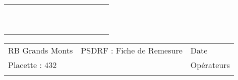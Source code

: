 \documentclass[a4paper, landscape]{article}\usepackage[]{graphicx}\usepackage[]{color}
\begin{document}
{\begin{tabular}{|p{1cm}|p{2cm}|p{1.6cm}|p{1.6cm}|p{1.6cm}|p{1.6cm}|p{1.5cm}|p{1.5cm}|p{1.5cm}|p{1.5cm}|p{1.5cm}|p{7.5cm}|p{5cm}|}
   \rowcolor[gray]{0.95} \hline
 &  &  &  &  &  &  &  &  &  &  &  &  \\ 
   \hline
 &  &  &  &  &  &  &  &  &  &  &  &  \\ 
   \rowcolor[gray]{0.95} \hline
 &  &  &  &  &  &  &  &  &  &  &  &  \\ 
   \hline
 &  &  &  &  &  &  &  &  &  &  &  &  \\ 
   \rowcolor[gray]{0.95} \hline
 &  &  &  &  &  &  &  &  &  &  &  &  \\ 
   \hline
 &  &  &  &  &  &  &  &  &  &  &  &  \\ 
   \rowcolor[gray]{0.95} \hline
 &  &  &  &  &  &  &  &  &  &  &  &  \\ 
   \hline
 &  &  &  &  &  &  &  &  &  &  &  &  \\ 
   \rowcolor[gray]{0.95} \hline
 &  &  &  &  &  &  &  &  &  &  &  &  \\ 
   \hline
 &  &  &  &  &  &  &  &  &  &  &  &  \\ 
   \rowcolor[gray]{0.95} \hline
 &  &  &  &  &  &  &  &  &  &  &  &  \\ 
   \hline
\end{tabular}
}

\begin{tabular}{p{10cm}p{10cm}p{8cm}}
  RB Grands Monts & PSDRF : Fiche de Remesure & Date \\ 
  Placette : 432 &  & Opérateurs \\ 
   &  &  \\ 
  \end{tabular}
\end{document}
